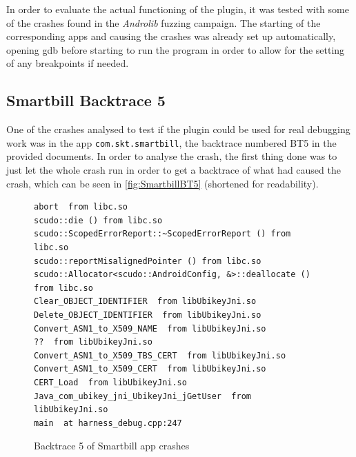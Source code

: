 \documentclass[a4paper,11pt,oneside]{report}
\begin{document}
In order to evaluate the actual functioning of the plugin, it was tested with
some of the crashes found in the \textit{Androlib} fuzzing campaign. 
The starting of the corresponding
apps and causing the crashes was already set up automatically, opening gdb
before starting to run the program in order to allow for the setting of any
breakpoints if needed.

\subsection{Smartbill Backtrace 5}

One of the crashes analysed to test if the plugin could be used for real
debugging work was in the app \verb|com.skt.smartbill|, the backtrace numbered
BT5 in the provided documents. In order to analyse the crash, the first thing
done was to just let the whole crash run in order to get a backtrace of what
had caused the crash, which can be seen in \autoref{fig:SmartbillBT5}
(shortened for readability).

\begin{figure}[h!]
  \centering
\begin{verbatim}
abort  from libc.so
scudo::die () from libc.so
scudo::ScopedErrorReport::~ScopedErrorReport () from libc.so
scudo::reportMisalignedPointer () from libc.so
scudo::Allocator<scudo::AndroidConfig, &>::deallocate () from libc.so
Clear_OBJECT_IDENTIFIER  from libUbikeyJni.so
Delete_OBJECT_IDENTIFIER  from libUbikeyJni.so
Convert_ASN1_to_X509_NAME  from libUbikeyJni.so
??  from libUbikeyJni.so
Convert_ASN1_to_X509_TBS_CERT  from libUbikeyJni.so
Convert_ASN1_to_X509_CERT  from libUbikeyJni.so
CERT_Load  from libUbikeyJni.so
Java_com_ubikey_jni_UbikeyJni_jGetUser  from libUbikeyJni.so
main  at harness_debug.cpp:247
\end{verbatim}
  \caption{Backtrace 5 of Smartbill app crashes}
  \label{fig:SmartbillBT5}
\end{figure}
\end{document}
